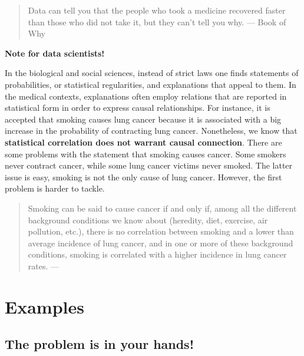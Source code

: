 \documentclass[
]{book}
\begin{document}
\begin{quote}
Data can tell you that the people who took a medicine recovered faster than those who did not take it, but they can't tell you why. --- Book of Why
\end{quote}

\begin{tipbox}

\textbf{Note for data scientists!}

In the biological and social sciences, instead of strict laws one finds statements of probabilities, or statistical regularities, and explanations that appeal to them. In the medical contexts, explanations often employ relations that are reported in statistical form in order to express causal relationships. For instance, it is accepted that smoking causes lung cancer because it is associated with a big increase in the probability of contracting lung cancer. Nonetheless, we know that \textbf{statistical correlation does not warrant causal connection}. There are some problems with the statement that smoking causes cancer. Some smokers never contract cancer, while some lung cancer victims never smoked. The latter issue is easy, smoking is not the only cause of lung cancer. However, the first problem is harder to tackle.

\begin{quote}
Smoking can be said to cause cancer if and only if, among all the different background conditions we know about (heredity, diet, exercise, air pollution, etc.), there is no correlation between smoking and a lower than average incidence of lung cancer, and in one or more of these background conditions, smoking is correlated with a higher incidence in lung cancer rates. --- \citep{rosenberg2019philosophy}
\end{quote}

\end{tipbox}

\newpage

\hypertarget{examples-1}{%
\section{Examples}\label{examples-1}}

\hypertarget{semmelweis}{%
\subsection{The problem is in your hands!}\label{semmelweis}}
\end{document}
